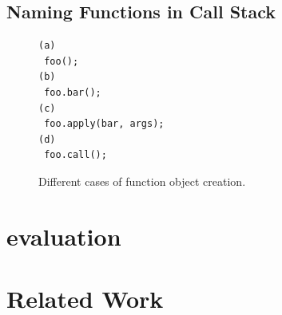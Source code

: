 \documentclass{acm_proc_article-sp}
\begin{document}
{\subsection{Naming Functions in Call Stack}








\begin{figure}[htp]
\begin{verbatim}
(a)
 foo();
(b)
 foo.bar();
(c)
 foo.apply(bar, args);
(d)
 foo.call();
\end{verbatim}
\caption{Different cases of function object creation.}
\label{fig:functionCall}
\end{figure}



\section{evaluation}



\section{Related Work}










}
\end{document}
